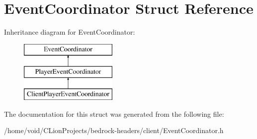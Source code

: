 \hypertarget{struct_event_coordinator}{}\section{Event\+Coordinator Struct Reference}
\label{struct_event_coordinator}
Inheritance diagram for Event\+Coordinator\+:\begin{figure}[H]
\begin{center}
\leavevmode
\includegraphics[height=3.000000cm]{struct_event_coordinator}
\end{center}
\end{figure}


The documentation for this struct was generated from the following file\+:\begin{DoxyCompactItemize}
\item 
/home/void/\+C\+Lion\+Projects/bedrock-\/headers/client/Event\+Coordinator.\+h\end{DoxyCompactItemize}
